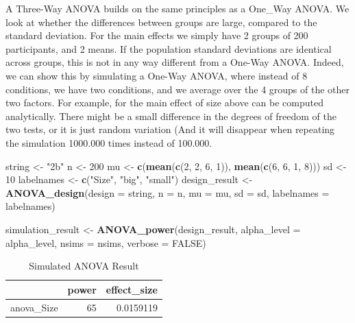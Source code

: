 \documentclass[]{book}
\newenvironment{Shaded}{\begin{snugshade}}{\end{snugshade}}
\newcommand{\DataTypeTok}[1]{\textcolor[rgb]{0.13,0.29,0.53}{#1}}
\newcommand{\DecValTok}[1]{\textcolor[rgb]{0.00,0.00,0.81}{#1}}
\newcommand{\KeywordTok}[1]{\textcolor[rgb]{0.13,0.29,0.53}{\textbf{#1}}}
\newcommand{\NormalTok}[1]{#1}
\newcommand{\OtherTok}[1]{\textcolor[rgb]{0.56,0.35,0.01}{#1}}
\newcommand{\StringTok}[1]{\textcolor[rgb]{0.31,0.60,0.02}{#1}}
\begin{document}
A Three-Way ANOVA builds on the same principles as a One\_Way ANOVA. We look at whether the differences between groups are large, compared to the standard deviation. For the main effects we simply have 2 groups of 200 participants, and 2 means. If the population standard deviations are identical across groups, this is not in any way different from a One-Way ANOVA. Indeed, we can show this by simulating a One-Way ANOVA, where instead of 8 conditions, we have two conditions, and we average over the 4 groups of the other two factors. For example, for the main effect of size above can be computed analytically. There might be a small difference in the degrees of freedom of the two tests, or it is just random variation (And it will disappear when repeating the simulation 1000.000 times instead of 100.000.

\begin{Shaded}
\begin{Highlighting}[]
\NormalTok{string <-}\StringTok{ "2b"}
\NormalTok{n <-}\StringTok{ }\DecValTok{200}
\NormalTok{mu <-}\StringTok{ }\KeywordTok{c}\NormalTok{(}\KeywordTok{mean}\NormalTok{(}\KeywordTok{c}\NormalTok{(}\DecValTok{2}\NormalTok{, }\DecValTok{2}\NormalTok{, }\DecValTok{6}\NormalTok{, }\DecValTok{1}\NormalTok{)), }\KeywordTok{mean}\NormalTok{(}\KeywordTok{c}\NormalTok{(}\DecValTok{6}\NormalTok{, }\DecValTok{6}\NormalTok{, }\DecValTok{1}\NormalTok{, }\DecValTok{8}\NormalTok{)))}
\NormalTok{sd <-}\StringTok{ }\DecValTok{10}
\NormalTok{labelnames <-}\StringTok{ }\KeywordTok{c}\NormalTok{(}\StringTok{"Size"}\NormalTok{, }\StringTok{"big"}\NormalTok{, }\StringTok{"small"}\NormalTok{)}
\NormalTok{design_result <-}\StringTok{ }\KeywordTok{ANOVA_design}\NormalTok{(}\DataTypeTok{design =}\NormalTok{ string,}
                   \DataTypeTok{n =}\NormalTok{ n, }
                   \DataTypeTok{mu =}\NormalTok{ mu, }
                   \DataTypeTok{sd =}\NormalTok{ sd, }
                   \DataTypeTok{labelnames =}\NormalTok{ labelnames)}

\NormalTok{simulation_result <-}\StringTok{ }\KeywordTok{ANOVA_power}\NormalTok{(design_result, }
                                 \DataTypeTok{alpha_level =}\NormalTok{ alpha_level, }
                                 \DataTypeTok{nsims =}\NormalTok{ nsims,}
                                 \DataTypeTok{verbose =} \OtherTok{FALSE}\NormalTok{)}
\end{Highlighting}
\end{Shaded}

\begin{table}[t]

\caption{\label{tab:unnamed-chunk-135}Simulated ANOVA Result}
\centering
\begin{tabular}{l|r|r}
\hline
  & power & effect\_size\\
\hline
anova\_Size & 65 & 0.0159119\\
\hline
\end{tabular}
\end{table}
\end{document}
